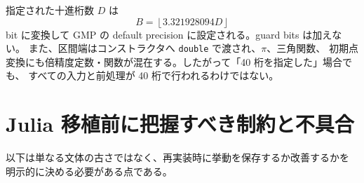 \documentclass[a4paper,11pt]{ltjsarticle}
\newcommand{\code}[1]{\texttt{#1}}
\begin{document}
指定された十進桁数 \(D\) は
\begin{equation}
  B=\left\lfloor 3.321928094D\right\rfloor
\end{equation}
bit に変換して GMP の default precision に設定される。guard bits は加えない。
また、区間端はコンストラクタへ \code{double} で渡され、\(\pi\)、三角関数、
初期点変換にも倍精度定数・関数が混在する。したがって「40 桁を指定した」場合でも、
すべての入力と前処理が 40 桁で行われるわけではない。

\section{Julia 移植前に把握すべき制約と不具合}

以下は単なる文体の古さではなく、再実装時に挙動を保存するか改善するかを
明示的に決める必要がある点である。
\end{document}
